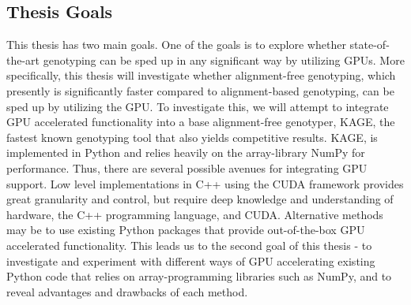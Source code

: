\subsection{Thesis Goals} \label{introduction:thesis_goals}
This thesis has two main goals.
One of the goals is to explore whether state-of-the-art genotyping can be sped up in any significant way by utilizing GPUs.
More specifically, this thesis will investigate whether alignment-free genotyping, which presently is significantly faster compared to alignment-based genotyping, can be sped up by utilizing the GPU.
To investigate this, we will attempt to integrate GPU accelerated functionality into a base alignment-free genotyper, KAGE, the fastest known genotyping tool that also yields competitive results.
KAGE, is implemented in Python and relies heavily on the array-library NumPy for performance.
Thus, there are several possible avenues for integrating GPU support. 
Low level implementations in C++ using the CUDA framework provides great granularity and control, but require deep knowledge and understanding of hardware, the C++ programming language, and CUDA.
Alternative methods may be to use existing Python packages that provide out-of-the-box GPU accelerated functionality.
This leads us to the second goal of this thesis - to investigate and experiment with different ways of GPU accelerating existing Python code that relies on array-programming libraries such as NumPy, and to reveal advantages and drawbacks of each method.
